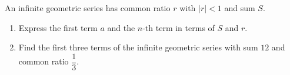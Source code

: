 An infinite geometric series has common ratio $r$ with $|r|<1$ and sum $S$.
\begin{enumerate}
\item[(a)] Express the first term $a$ and the $n$-th term in terms of $S$ and $r$.
\item[(b)] Find the first three terms of the infinite geometric series with sum $12$ and common ratio $\dfrac{1}{3}$.
\end{enumerate}
